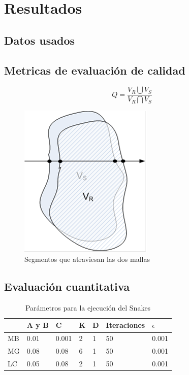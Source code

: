 \chapter{Resultados}
\section{Datos usados}
\section{Metricas de evaluación de calidad}

$$ Q = \dfrac{V_{R}\bigcup V_{S}}{V_{R}\bigcap V_{S}}$$

\begin{figure}[H]
\centering
\includegraphics[scale=0.7]{images/calculo_indicador.png}
\caption{Segmentos que atraviesan las dos mallas}
\label{fig:discretizacionvolumen}
\end{figure}

\section{Evaluación cuantitativa}

\begin{table}[h]
	\centering
	\begin{tabular}{l|llllll}
		& A y B & C & K & D & Iteraciones & $\epsilon$ \\ \hline
		MB & 0.01 & 0.001 & 2 & 1 & 50 & 0.001 \\
		MG & 0.08 & 0.08 & 6 & 1 & 50 & 0.001 \\
		LC & 0.05 & 0.08 & 2 & 1 & 50 & 0.001
	\end{tabular}
	\caption{Parámetros para la ejecución del Snakes}
	\label{table:parametros_snakes}
\end{table}

